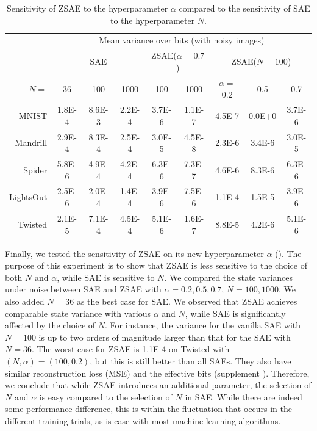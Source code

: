 \begin{table}[htb]
 \centering
 \setlength{\tabcolsep}{0.25em}
 \begin{tabular}{|r|*{8}{c|}}
     & \multicolumn{8}{c|}{Mean variance over bits (with noisy images)} \\
     & \multicolumn{3}{c|}{SAE} 
     & \multicolumn{2}{c|}{ZSAE($\alpha=0.7$)} 
     & \multicolumn{3}{c|}{ZSAE($N=100$)}
  \\
$N=$      &36     & 100    & 1000   & 100    & 1000   & $\alpha=$0.2 & 0.5    & 0.7    \\
MNIST     &1.8E-4 & 8.6E-3 & 2.2E-4 & 3.7E-6 & 1.1E-7 & 4.5E-7       & 0.0E+0 & 3.7E-6 \\
Mandrill  &2.9E-4 & 8.3E-4 & 2.5E-4 & 3.0E-5 & 4.5E-8 & 2.3E-6       & 3.4E-6 & 3.0E-5 \\
Spider    &5.8E-6 & 4.9E-4 & 4.2E-4 & 6.3E-6 & 7.3E-7 & 4.6E-6       & 8.3E-6 & 6.3E-6 \\
LightsOut &2.5E-6 & 2.0E-4 & 1.4E-4 & 3.9E-6 & 7.5E-6 & 1.1E-4       & 1.5E-5 & 3.9E-6 \\
Twisted   &2.1E-5 & 7.1E-4 & 4.5E-4 & 5.1E-6 & 1.6E-7 & 8.8E-5       & 4.2E-6 & 5.1E-6 \\
\end{tabular}
 \caption{Sensitivity of ZSAE to the hyperparameter $\alpha$ compared to the sensitivity of SAE to the hyperparameter $N$.}
 \label{sensitivity}
\end{table}

Finally, we tested the sensitivity of ZSAE on its new hyperparameter $\alpha$ ().
The purpose of this experiment is to show that ZSAE is less sensitive to the choice of both $N$ and $\alpha$,
while SAE is sensitive to $N$.
% 
We compared the state variances under noise
between SAE and ZSAE with $\alpha=0.2,0.5,0.7$, $N=100,1000$.
We also added $N=36$ as the best case for SAE.
% 
We observed that ZSAE achieves comparable state variance with various $\alpha$ and $N$,
while SAE is significantly affected by the choice of $N$.
For instance,
the variance for the vanilla SAE with $N=100$ is up to two orders of magnitude larger than that for the SAE with $N=36$.
The worst case for ZSAE is 1.1E-4 on Twisted with $(N,\alpha)=(100,0.2)$,
but this is still better than all SAEs.
% 
They also have similar reconstruction loss (MSE) and the effective bits (supplement ).
Therefore, we conclude that while ZSAE introduces an additional parameter,
the selection of $N$ and $\alpha$ is easy compared to the selection of $N$ in SAE.
While there are indeed some performance difference,
this is within the fluctuation that occurs in the different training trials,
as is case with most machine learning algorithms.


